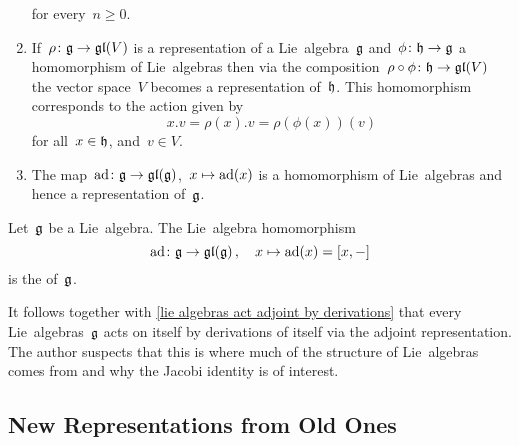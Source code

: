 \begin{examples}
\begin{enumerate}
      for every~$n \geq 0$.
    \item
      If~$\rho \colon \mathfrak{g} \to \mathfrak{gl}(V)$ is a representation of a Lie~algebra~$\mathfrak{g}$ and~$\phi \colon \mathfrak{h} \to \mathfrak{g}$ a homomorphism of Lie~algebras then via the composition~$\rho \circ \phi \colon \mathfrak{h} \to \mathfrak{gl}(V)$ the vector space~$V$ becomes a representation of~$\mathfrak{h}$.
      This homomorphism corresponds to the action given by
      \[
        x.v = \rho(x).v = \rho(\phi(x))(v)
      \]
      for all~$x \in \mathfrak{h}$, and~$v \in V$.
    \item
      The map~$\operatorname{ad} \colon \mathfrak{g} \to \mathfrak{gl}(\mathfrak{g})$,~$x \mapsto \operatorname{ad}(x)$ is a homomorphism of Lie~algebras and hence a representation of~$\mathfrak{g}$.
  \end{enumerate}
\end{examples}


\begin{definition}
  Let~$\mathfrak{g}$ be a Lie~algebra.
  The  Lie~algebra homomorphism
  \[
    \operatorname{ad}
    \colon
    \mathfrak{g}
    \to
    \mathfrak{gl}(\mathfrak{g}) \,,
    \quad
    x
    \mapsto
    \operatorname{ad}(x)
    =
    [x,-]
  \]
  is the  of~$\mathfrak{g}$.
\end{definition}


\begin{remark}
  It follows together with \cref{lie algebras act adjoint by derivations} that every Lie~algebras~$\mathfrak{g}$ acts on itself by derivations of itself via the adjoint representation.
  The author suspects that this is where much of the structure of Lie~algebras comes from and why the Jacobi identity is of interest.
\end{remark}





\subsection{New Representations from Old Ones}


